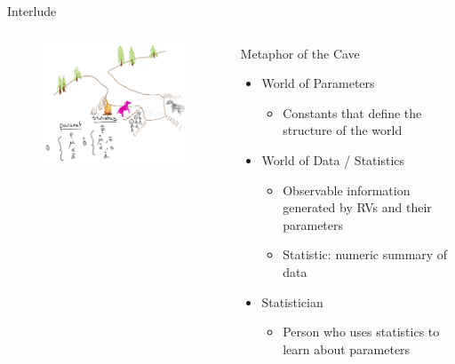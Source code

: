 \documentclass[aspectratio=169]{../latex_main/tntbeamer}  %
\begin{document}
	
		\begin{frame}{Interlude}
	    \begin{columns}
	        \begin{column}{.5\textwidth}
	     
	           \begin{figure}
	               \includegraphics[scale=.75]{Bild23}
	           \end{figure}
	        \end{column}
	        
	        \begin{column}{.4\textwidth}
	            Metaphor of the Cave\\
	            \begin{itemize}
	                \item World of Parameters
	                \begin{itemize}
	                    \item Constants that define the structure of the world
	                \end{itemize}
	                \item World of Data / Statistics
	                \begin{itemize}
	                    \item Observable information generated by RVs and their parameters
	                    \item Statistic: numeric summary of data
	                \end{itemize}
	                \item Statistician
	                \begin{itemize}
	                    \item Person who uses statistics to learn about parameters
	                \end{itemize}
	            \end{itemize}
	        \end{column}
	        \end{columns}
	    
	\end{frame}
	
\end{document}
